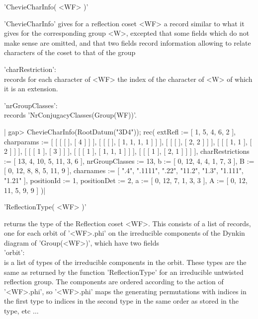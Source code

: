 
'ChevieCharInfo( <WF> )'

'ChevieCharInfo' gives for a reflection coset <WF> a record similar to what
it  gives for the corresponding group  <W>, excepted that some fields which
do  not  make  sense  are  omitted,  and that two fields record information
allowing to relate characters of the coset to that of the group\:

'charRestriction':\\ records for each character of <WF> the index of the
   character of <W> of which it is an extension.

'nrGroupClasses':\\ records 'NrConjugacyClasses(Group(WF))'.

|    gap> ChevieCharInfo(RootDatum("3D4"));
    rec(
      extRefl := [ 1, 5, 4, 6, 2 ],
      charparams := [ [ [ [  ], [ 4 ] ] ], [ [ [  ], [ 1, 1, 1, 1 ] ] ],
          [ [ [  ], [ 2, 2 ] ] ], [ [ [ 1, 1 ], [ 2 ] ] ],
          [ [ [ 1 ], [ 3 ] ] ], [ [ [ 1 ], [ 1, 1, 1 ] ] ],
          [ [ [ 1 ], [ 2, 1 ] ] ] ],
      charRestrictions := [ 13, 4, 10, 5, 11, 3, 6 ],
      nrGroupClasses := 13,
      b := [ 0, 12, 4, 4, 1, 7, 3 ],
      B := [ 0, 12, 8, 8, 5, 11, 9 ],
      charnames := [ ".4", ".1111", ".22", "11.2", "1.3", "1.111", "1.21"
         ],
      positionId := 1,
      positionDet := 2,
      a := [ 0, 12, 7, 1, 3, 3 ],
      A := [ 0, 12, 11, 5, 9, 9 ] )|


'ReflectionType( <WF> )'

returns  the type of the Reflection coset  <WF>. This consists of a list of
records,  one for each orbit of '<WF>.phi' on the irreducible components of
the Dynkin diagram of 'Group(<WF>)', which have two fields\:\\

'orbit':\\ is a list of types of the irreducible components in the orbit.
   These  types are the  same as returned  by the function 'ReflectionType'
   for  an  irreducible  untwisted  reflection  group.  The  components are
   ordered  according to the  action of '<WF>.phi',  so '<WF>.phi' maps the
   generating permutations with indices in the first type to indices in the
   second type in the same order as stored in the type, etc $\ldots$\\

